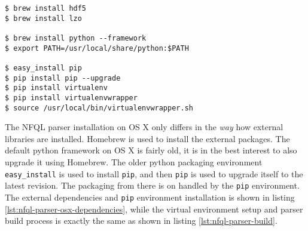 \begin{lstlisting}
$ brew install hdf5
$ brew install lzo

$ brew install python --framework
$ export PATH=/usr/local/share/python:$PATH

$ easy_install pip
$ pip install pip --upgrade
$ pip install virtualenv
$ pip install virtualenvwrapper
$ source /usr/local/bin/virtualenvwrapper.sh
\end{lstlisting}

The \ac{NFQL} parser installation on OS X only differs in the \emph{way} how
external libraries are installed. Homebrew is used to install the external
packages.  The default python framework on OS X is fairly old, it is in the
best interest to also upgrade it using Homebrew. The older python packaging
 environment \texttt{easy\_install} is used to
install \texttt{pip}, and then \texttt{pip} is used to upgrade itself to the
latest revision. The packaging from there is on handled by the \texttt{pip}
environment. The external dependencies and \texttt{pip} environment
installation is shown in listing \ref{lst:nfql-parser-osx-dependencies}, while
the virtual environment setup and parser build process is exactly the same as
shown in listing \ref{lst:nfql-parser-build}.
